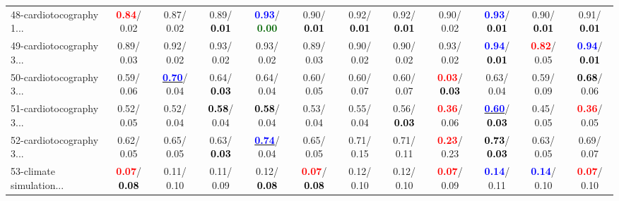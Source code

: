 \begin{table}[h]
\begin{center}
{\begin{tabular}{lc|c|c|c|c|c|c|c|c|c|c}
48-cardiotocography 1... & \textcolor{red}{\textbf{  0.84}}/  0.02 &   0.87/  0.02 &   0.89/\textcolor{black}{\textbf{  0.01}} & \textcolor{blue}{\textbf{  0.93}}/\textcolor{darkgreen}{\textbf{  0.00}} &   0.90/\textcolor{black}{\textbf{  0.01}} &   0.92/\textcolor{black}{\textbf{  0.01}} &   0.92/\textcolor{black}{\textbf{  0.01}} &   0.90/  0.02 & \textcolor{blue}{\textbf{  0.93}}/\textcolor{black}{\textbf{  0.01}} &   0.90/\textcolor{black}{\textbf{  0.01}} &   0.91/\textcolor{black}{\textbf{  0.01}} \\
49-cardiotocography 3... &   0.89/  0.03 &   0.92/  0.02 &   0.93/  0.02 &   0.93/  0.02 &   0.89/  0.03 &   0.90/  0.02 &   0.90/  0.02 &   0.93/  0.02 & \textcolor{blue}{\textbf{  0.94}}/\textcolor{black}{\textbf{  0.01}} & \textcolor{red}{\textbf{  0.82}}/  0.05 & \textcolor{blue}{\textbf{  0.94}}/\textcolor{black}{\textbf{  0.01}} \\
50-cardiotocography 3... &   0.59/  0.06 & \underline{\textcolor{blue}{\textbf{  0.70}}}/  0.04 &   0.64/\textcolor{black}{\textbf{  0.03}} &   0.64/  0.04 &   0.60/  0.05 &   0.60/  0.07 &   0.60/  0.07 & \textcolor{red}{\textbf{  0.03}}/\textcolor{black}{\textbf{  0.03}} &   0.63/  0.04 &   0.59/  0.09 & \textcolor{black}{\textbf{  0.68}}/  0.06 \\
51-cardiotocography 3... &   0.52/  0.05 &   0.52/  0.04 & \textcolor{black}{\textbf{  0.58}}/  0.04 & \textcolor{black}{\textbf{  0.58}}/  0.04 &   0.53/  0.04 &   0.55/  0.04 &   0.56/\textcolor{black}{\textbf{  0.03}} & \textcolor{red}{\textbf{  0.36}}/  0.06 & \underline{\textcolor{blue}{\textbf{  0.60}}}/\textcolor{black}{\textbf{  0.03}} &   0.45/  0.05 & \textcolor{red}{\textbf{  0.36}}/  0.05 \\
52-cardiotocography 3... &   0.62/  0.05 &   0.65/  0.05 &   0.63/\textcolor{black}{\textbf{  0.03}} & \underline{\textcolor{blue}{\textbf{  0.74}}}/  0.04 &   0.65/  0.05 &   0.71/  0.15 &   0.71/  0.11 & \textcolor{red}{\textbf{  0.23}}/  0.23 & \textcolor{black}{\textbf{  0.73}}/\textcolor{black}{\textbf{  0.03}} &   0.63/  0.05 &   0.69/  0.07 \\
53-climate simulation... & \textcolor{red}{\textbf{  0.07}}/\textcolor{black}{\textbf{  0.08}} &   0.11/  0.10 &   0.11/  0.09 &   0.12/\textcolor{black}{\textbf{  0.08}} & \textcolor{red}{\textbf{  0.07}}/\textcolor{black}{\textbf{  0.08}} &   0.12/  0.10 &   0.12/  0.10 & \textcolor{red}{\textbf{  0.07}}/  0.09 & \textcolor{blue}{\textbf{  0.14}}/  0.11 & \textcolor{blue}{\textbf{  0.14}}/  0.10 & \textcolor{red}{\textbf{  0.07}}/  0.10 \\ \hline

\end{tabular}}
\end{center}
\end{table}
